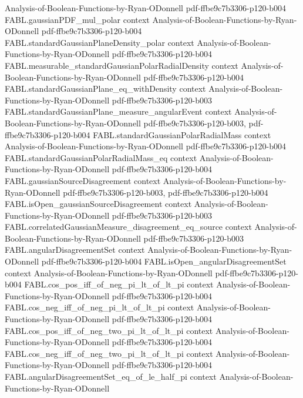 \begin{theorem}
  {Analysis-of-Boolean-Functions-by-Ryan-ODonnell}
  {pdf-ffbe9c7b3306-p120-b004}
\proofstep
  {FABL.gaussianPDF_mul_polar}
  {context}
  {Analysis-of-Boolean-Functions-by-Ryan-ODonnell}
  {pdf-ffbe9c7b3306-p120-b004}
\proofstep
  {FABL.standardGaussianPlaneDensity_polar}
  {context}
  {Analysis-of-Boolean-Functions-by-Ryan-ODonnell}
  {pdf-ffbe9c7b3306-p120-b004}
\proofstep
  {FABL.measurable_standardGaussianPolarRadialDensity}
  {context}
  {Analysis-of-Boolean-Functions-by-Ryan-ODonnell}
  {pdf-ffbe9c7b3306-p120-b004}
\proofstep
  {FABL.standardGaussianPlane_eq_withDensity}
  {context}
  {Analysis-of-Boolean-Functions-by-Ryan-ODonnell}
  {pdf-ffbe9c7b3306-p120-b003}
\proofstep
  {FABL.standardGaussianPlane_measure_angularEvent}
  {context}
  {Analysis-of-Boolean-Functions-by-Ryan-ODonnell}
  {pdf-ffbe9c7b3306-p120-b003,
    pdf-ffbe9c7b3306-p120-b004}
\proofstep
  {FABL.standardGaussianPolarRadialMass}
  {context}
  {Analysis-of-Boolean-Functions-by-Ryan-ODonnell}
  {pdf-ffbe9c7b3306-p120-b004}
\proofstep
  {FABL.standardGaussianPolarRadialMass_eq}
  {context}
  {Analysis-of-Boolean-Functions-by-Ryan-ODonnell}
  {pdf-ffbe9c7b3306-p120-b004}
\proofstep
  {FABL.gaussianSourceDisagreement}
  {context}
  {Analysis-of-Boolean-Functions-by-Ryan-ODonnell}
  {pdf-ffbe9c7b3306-p120-b003,
    pdf-ffbe9c7b3306-p120-b004}
\proofstep
  {FABL.isOpen_gaussianSourceDisagreement}
  {context}
  {Analysis-of-Boolean-Functions-by-Ryan-ODonnell}
  {pdf-ffbe9c7b3306-p120-b003}
\proofstep
  {FABL.correlatedGaussianMeasure_disagreement_eq_source}
  {context}
  {Analysis-of-Boolean-Functions-by-Ryan-ODonnell}
  {pdf-ffbe9c7b3306-p120-b003}
\proofstep
  {FABL.angularDisagreementSet}
  {context}
  {Analysis-of-Boolean-Functions-by-Ryan-ODonnell}
  {pdf-ffbe9c7b3306-p120-b004}
\proofstep
  {FABL.isOpen_angularDisagreementSet}
  {context}
  {Analysis-of-Boolean-Functions-by-Ryan-ODonnell}
  {pdf-ffbe9c7b3306-p120-b004}
\proofstep
  {FABL.cos_pos_iff_of_neg_pi_lt_of_lt_pi}
  {context}
  {Analysis-of-Boolean-Functions-by-Ryan-ODonnell}
  {pdf-ffbe9c7b3306-p120-b004}
\proofstep
  {FABL.cos_neg_iff_of_neg_pi_lt_of_lt_pi}
  {context}
  {Analysis-of-Boolean-Functions-by-Ryan-ODonnell}
  {pdf-ffbe9c7b3306-p120-b004}
\proofstep
  {FABL.cos_pos_iff_of_neg_two_pi_lt_of_lt_pi}
  {context}
  {Analysis-of-Boolean-Functions-by-Ryan-ODonnell}
  {pdf-ffbe9c7b3306-p120-b004}
\proofstep
  {FABL.cos_neg_iff_of_neg_two_pi_lt_of_lt_pi}
  {context}
  {Analysis-of-Boolean-Functions-by-Ryan-ODonnell}
  {pdf-ffbe9c7b3306-p120-b004}
\proofstep
  {FABL.angularDisagreementSet_eq_of_le_half_pi}
  {context}
  {Analysis-of-Boolean-Functions-by-Ryan-ODonnell}

\end{theorem}
